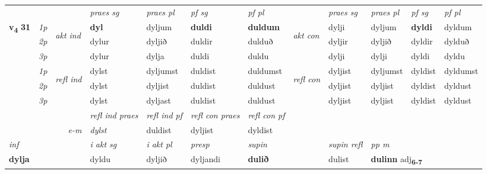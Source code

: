 \begin{longtable}[l]{X>{\footnotesize\itshape}llXXXXlXXXX}
 & &   & \textit{praes sg}  & \textit{praes pl}    & \textit{ pf sg} & \textit{pf pl} & & \textit{praes sg}  & \textit{praes pl}    & \textit{pf sg} & \textit{pf pl }  \\ \cmidrule{4-7} \cmidrule{9-12}
 \multirow{2}{*}{{{\textbf{v{\textsubscript{4}}} \Large{\textbf{31}}}}}  & 1p & \multirow{3}{*}{\begin{turn}{90}\textit{akt ind}\end{turn}} & \textbf{dyl} & dyljum & \textbf{duldi} & \textbf{duldum} & \multirow{3}{*}{\begin{turn}{90}\textit{akt con}\end{turn}} &dylji & dyljum & \textbf{dyldi} & dyldum\\*
 & 2p &  &  dylur  & dyljið & duldir & dulduð & & dyljir & dyljið & dyldir & dylduð \\*
 & 3p &  & dylur & dylja & duldi & duldu & & dylji & dylji& dyldi & dyldu \\*
\cmidrule{4-7} \cmidrule{9-12}
 & 1p & \multirow{3}{*}{\begin{turn}{90}\textit{refl ind}\end{turn}}  & dylst & dyljumst & duldist & duldumst & \multirow{3}{*}{\begin{turn}{90}\textit{refl con}\end{turn}}  &dyljist & dyljumst & dyldist & dyldumst \\*
 & 2p &  & dylst & dyljist & duldist & duldust & &dyljist & dyljist & dyldist & dyldust \\*
 & 3p  & & dylst & dyljast & duldist & duldust & & dyljist & dyljist& dyldist & dyldust \\*
\cmidrule{4-7} \cmidrule{9-12}

 & && \textit{refl ind praes} & \textit{refl ind pf} & \textit{refl con praes} & \textit{refl con pf} \\*
\multicolumn{3}{r}{\textit{e-m}}& dylst & duldist & dyljist & dyldist \\*

\cmidrule{4-7}
   {\textit{inf}} & &  & \textit{i akt sg} & \textit{i akt pl}   & \textit{presp} & \textit{supin} && \textit{supin refl} & \textit{pp m} \\*
  {\textbf{dylja}} & && dyldu  & dyljið   & dyljandi &  \textbf{dulið} && dulist & \multicolumn{2}{l}{\textbf{dulinn} adj\textbf{\textsubscript{6-7}}} \\*

\midrule


\end{longtable}
